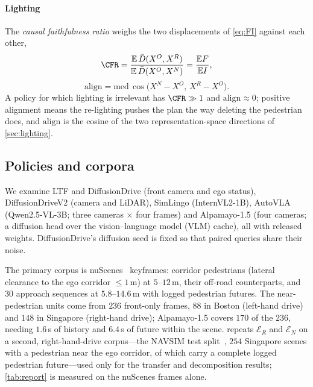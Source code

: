 \paragraph{Lighting}
The \emph{causal faithfulness ratio} weighs the two displacements of \eqref{eq:FI} against
each other,
\begin{equation}
\CFR=\frac{\mathbb{E}\,\bar D(X^{O},X^{R})}{\mathbb{E}\,\bar D(X^{O},X^{N})}=\frac{\mathbb{E}F}{\mathbb{E}I},
\label{eq:cfr}
\end{equation}
\begin{equation}
\mathrm{align}=\mathrm{med}\,\cos\!\big(X^{N}\!-X^{O},\,X^{R}\!-X^{O}\big).
\label{eq:align}
\end{equation}
A policy for which lighting is irrelevant has $\CFR\gg1$ and $\mathrm{align}\approx0$; positive
alignment means the re-lighting pushes the plan the way deleting the pedestrian does, and
$\mathrm{align}$ is the cosine of the two representation-space directions of \cref{sec:lighting}.

\subsection{Policies and corpora}
We examine LTF and DiffusionDrive (front camera and ego status), DiffusionDriveV2 (camera and LiDAR),
SimLingo (InternVL2-1B), AutoVLA (Qwen2.5-VL-3B; three cameras $\times$ four frames) and Alpamayo-1.5
(four cameras; a diffusion head over the vision--language model (VLM) cache), all with released weights. DiffusionDrive's
diffusion seed is fixed so that paired queries share their noise.

The primary corpus is nuScenes~\cite{caesar2020nuscenes} keyframes: corridor pedestrians (lateral
clearance to the ego corridor $\le1$\,m) at $5$--$12$\,m, their off-road counterparts, and $30$
approach sequences at $5.8$--$14.6$\,m with logged pedestrian futures. The near-pedestrian units come
from $236$ front-only frames, $88$ in Boston (left-hand drive) and $148$ in Singapore (right-hand
drive); Alpamayo-1.5 covers $170$ of the $236$, needing $1.6$\,s of history and $6.4$\,s of future
within the scene.  repeats $\mathcal{E}_R$ and $\mathcal{E}_N$ on a second,
right-hand-drive corpus---the NAVSIM test split~\cite{dauner2024navsim}, $254$ Singapore scenes with a
pedestrian near the ego corridor, of which \NumSGscenes{} carry a complete logged pedestrian
future---used only for the transfer and decomposition results; \cref{tab:report} is measured on the
nuScenes frames alone.
